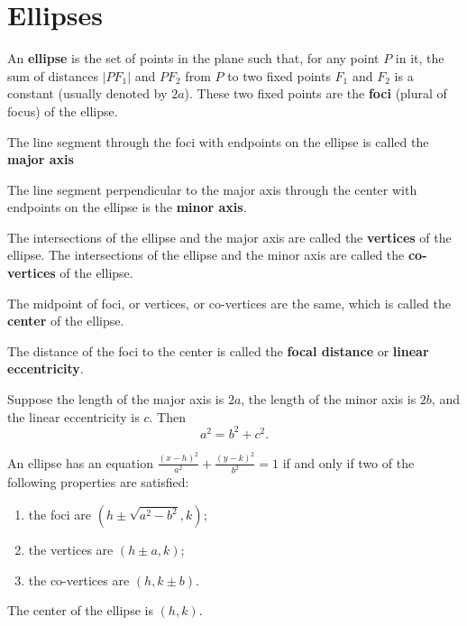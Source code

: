 \newpage


\section{Ellipses}

\begin{definition}
An \textbf{ellipse} is the set of points in the plane such that, for any point $P$ in it, the sum of distances $|PF_1|$ and $PF_2$ from $P$ to two fixed points $F_1$ and $F_2$ is a constant (usually denoted by $2a$). These two fixed points are the \textbf{foci} (plural of focus) of the ellipse.

The line segment through the foci with endpoints on the ellipse is called the \textbf{major axis}

The line segment perpendicular to the major axis through the center with endpoints on the ellipse is the \textbf{minor axis}.

The intersections of the ellipse and the major axis are called the \textbf{vertices} of the ellipse. The intersections of the ellipse and the minor axis are called the \textbf{co-vertices} of the ellipse.

The midpoint of foci, or vertices, or co-vertices are the same, which is called the \textbf{center} of the ellipse.

The distance of the foci to the center is called the \textbf{focal distance} or \textbf{linear eccentricity}. 

\end{definition}

\begin{proposition}
    Suppose the length of the major axis is $2a$, the length of the minor axis is $2b$, and the linear eccentricity is $c$. Then
    \[a^2=b^2+c^2.\]
\end{proposition}

\begin{theorem}
An ellipse has an equation $\frac{(x-h)^2}{a^2}+\frac{(y-k)^2}{b^2}=1$ if and only if two of the following properties are satisfied:
\begin{enumerate}
  \item the foci are $(h\pm \sqrt{a^2-b^2}, k)$;
  \item the vertices are $(h\pm a, k)$;
  \item the co-vertices are $(h, k\pm b)$.
\end{enumerate}
The center of the ellipse is $(h, k)$.
\end{theorem}

